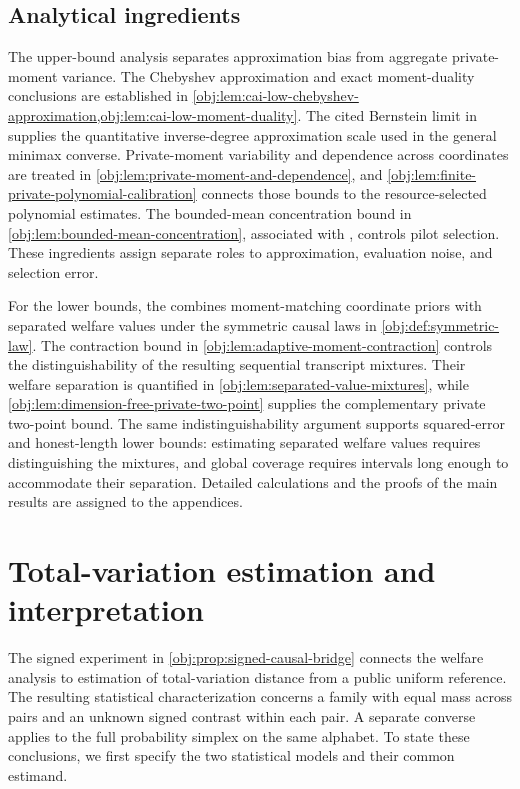 \documentclass[11pt]{article}
\begin{document}
\subsection{Analytical ingredients}

The upper-bound analysis separates approximation bias from aggregate private-moment variance. The Chebyshev approximation and exact moment-duality conclusions are established in \cref{obj:lem:cai-low-chebyshev-approximation,obj:lem:cai-low-moment-duality}. The cited Bernstein limit in \citet[Section 3.1, p.~8]{CaiLow2011Nonsmooth} supplies the quantitative inverse-degree approximation scale used in the general minimax converse. Private-moment variability and dependence across coordinates are treated in \cref{obj:lem:private-moment-and-dependence}, and \cref{obj:lem:finite-private-polynomial-calibration} connects those bounds to the resource-selected polynomial estimates. The bounded-mean concentration bound in \cref{obj:lem:bounded-mean-concentration}, associated with \citet{Hoeffding1963Bounded}, controls pilot selection. These ingredients assign separate roles to approximation, evaluation noise, and selection error.

For the lower bounds, the  combines moment-matching coordinate priors with separated welfare values under the symmetric causal laws in \cref{obj:def:symmetric-law}. The contraction bound in \cref{obj:lem:adaptive-moment-contraction} controls the distinguishability of the resulting sequential transcript mixtures. Their welfare separation is quantified in \cref{obj:lem:separated-value-mixtures}, while \cref{obj:lem:dimension-free-private-two-point} supplies the complementary private two-point bound. The same indistinguishability argument supports squared-error and honest-length lower bounds: estimating separated welfare values requires distinguishing the mixtures, and global coverage requires intervals long enough to accommodate their separation. Detailed calculations and the proofs of the main results are assigned to the appendices.


\section{Total-variation estimation and interpretation}

The signed experiment in \cref{obj:prop:signed-causal-bridge} connects the welfare analysis to estimation of total-variation distance from a public uniform reference. The resulting statistical characterization concerns a family with equal mass across pairs and an unknown signed contrast within each pair. A separate converse applies to the full probability simplex on the same alphabet. To state these conclusions, we first specify the two statistical models and their common estimand.
\end{document}
